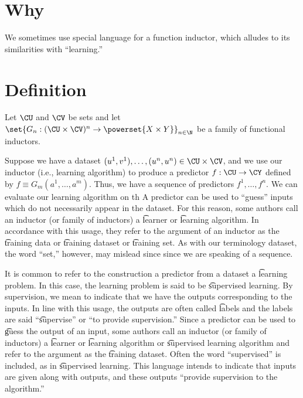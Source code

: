 

\section*{Why}

We sometimes use special language for a function inductor, which alludes to its similarities with ``learning.''

\section*{Definition}

Let $\CU$ and $\CV$ be sets and let $\set{G_n: (\CU \times \CV)^n \to \powerset{X \times  Y}}_{n \in \N  }$ be a family of functional inductors.

Suppose we have a dataset $(u^1, v^1), \dots , (u^n, u^n) \in \CU \times  \CV$, and we use our inductor (i.e., learning algorithm) to produce a predictor $f: \CU \to \CY$ defined by $f \equiv G_m(a^1, \dots , a^m)$.
Thus, we have a sequence of predictors $f^1, \dots , f^n$.
We can evaluate our learning algorithm on th
A predictor can be used to ``guess'' inputs which do not necessarily appear in the dataset.
For this reason, some authors call an inductor (or family of inductors) a \t{learner} or \t{learning algorithm}.
In accordance with this usage, they refer to the argument of an inductor as the \t{training data} or \t{training dataset} or \t{training set}.
As with our terminology dataset, the word ``set,'' however, may mislead since since we are speaking of a sequence.

It is common to refer to the construction a predictor from a dataset a \t{learning problem}.
In this case, the learning problem is said to be \t{supervised learning}.
By supervision, we mean to indicate that we have the outputs corresponding to the inputs.
In line with this usage, the outputs are often called \t{labels} and the labels are said ``\t{supervise}'' or ``to provide supervision.''
Since a predictor can be used to \t{guess} the output of an input, some authors call an inductor (or family of inductors) a \t{learner} or \t{learning algorithm} or \t{supervised learning algorithm} and refer to the argument as the \t{training dataset}.
Often the word ``supervised'' is included, as in \t{supervised learning}.
This language intends to indicate that inputs are given along with outputs, and these outputs ``provide supervision to the algorithm.''

\blankpage

